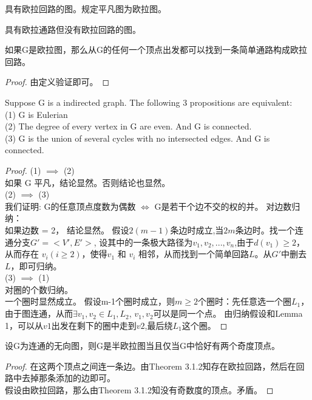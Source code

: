 \documentclass[11pt,fleqn]{book} %
\begin{document}
\begin{CJK}{UTF8}{gkai}
\begin{definition}
     具有欧拉回路的图。规定平凡图为欧拉图。
\end{definition}
\begin{definition}
    [半欧拉图] 具有欧拉通路但没有欧拉回路的图。
\end{definition}

\begin{lemma}
    如果G是欧拉图，那么从G的任何一个顶点出发都可以找到一条简单通路构成欧拉回路。
\end{lemma}
\begin{proof}
    由定义验证即可。
\end{proof}

\begin{theorem}
    Suppose G is a indirected graph. The following 3 propositions are equivalent: \\
    (1) G is Eulerian \\
    (2) The degree of every vertex in G are even. And G is connected.\\ 
    (3) G is the union of several cycles with no intersected edges. And G is connected.

\end{theorem}
\begin{proof} 
    (1) $\implies$ (2) \\
    如果 G 平凡，结论显然。否则结论也显然。 \\
    (2) $\implies$ (3) \\
    我们证明: G的任意顶点度数为偶数 $\iff$ G是若干个边不交的权的并。 对边数归纳： \\
    如果边数 = 2， 结论显然。 假设$2(m-1)$条边时成立,当$2m$条边时。找一个连通分支$G' = <V', E'>$, 设其中的一条极大路径为$v_1,v_2,...,v_n$,由于$d(v_1) \geq 2$，
    从而存在 $v_i(i \geq 2)$，使得$v_1$ 和 $v_i$ 相邻，从而找到一个简单回路$L$。从$G'$中删去$L$，即可归纳。\\
    (3) $\implies$ (1) \\
    对圈的个数归纳。\\
    一个圈时显然成立。
    假设m-1个圈时成立，则$m\geq 2$个圈时：先任意选一个圈$L_1$，由于图连通，从而$\exists v_1, v_2 \in L_1, L_2$, $v_1, v_2$可以是同一个点。 由归纳假设和Lemma 1，可以从$v1$出发在剩下的圈中走到$v2$,最后绕$L_1$这个圈。

\end{proof}

\begin{theorem}
    [半欧拉图的判定]
    设G为连通的无向图，则G是半欧拉图当且仅当G中恰好有两个奇度顶点。
\end{theorem}
\begin{proof}
    在这两个顶点之间连一条边。由Theorem 3.1.2知存在欧拉回路，然后在回路中去掉那条添加的边即可。\\
    假设由欧拉回路，那么由Theorem 3.1.2知没有奇数度的顶点。矛盾。
\end{proof}


\end{CJK}
\end{document}
